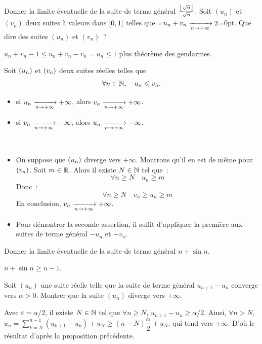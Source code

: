 \documentclass{magnoliaold}
\begin{document}
\begin{exos}
\exo Donner la limite éventuelle de la suite de terme général
  $\frac{\left\lfloor\sqrt{n}\right\rfloor}{\sqrt{n}}$.
\exo Soit $(u_n)$ et $(v_n)$ deux suites à valeurs dans $\left[0,1\right]$
  telles que =\hbox{$u_n+v_n\xrightarrow[n\rightarrow +\infty]{} 2$}=0pt.
  Que dire des suites $(u_n)$ et $(v_n)$~?
  \begin{sol}
  $u_n+v_n-1\leq u_n+v_n-v_n=u_n\leq 1$ plus théorème des gendarmes.
  \end{sol}
\end{exos}

\begin{proposition}[utile=-3]
Soit $\left(u_n\right)$ et $\left(v_n\right)$ deux suites réelles telles que
\[\forall n\in\mathbb{N} ,\quad u_n \leqslant v_n.\]
\begin{itemize}
\item si $u_n\xrightarrow[n\rightarrow +\infty]{}+\infty$, alors
  $v_n\xrightarrow[n\rightarrow +\infty]{}+\infty$.
\item si $v_n\xrightarrow[n\rightarrow +\infty]{}-\infty$, alors
  $u_n\xrightarrow[n\rightarrow +\infty]{}-\infty$.
\end{itemize}
\end{proposition}

\begin{preuve}
$\quad$
\begin{itemize}
\item On suppose que $\left(u_n\right)$ diverge vers $+\infty$. Montrons qu'il en est
  de même pour $\left(v_n\right)$. Soit $m\in\mathbb{R}$. Alors il existe $N\in\mathbb{N}$ tel que~:
  \[\forall n\geq N \quad u_n \geq m\]
  Donc~:
  \[\forall n\geq N \quad v_n \geq u_n \geq m\]
  En conclusion, $v_n\xrightarrow[n\rightarrow +\infty]{}+\infty$.
\item Pour démontrer la seconde assertion, il suffit d'appliquer la première
  aux suites de terme général $-u_n$ et $-v_n$.
\end{itemize}
\end{preuve}

\begin{exos}
\exo Donner la limite éventuelle de la suite de terme général
  $n+\sin n$.
  \begin{sol}
  $n+\sin n\geq n-1$.
  \end{sol}
\exo Soit $(u_n)$ une suite réelle telle que la suite de terme général
  $u_{n+1}-u_n$ converge vers $\alpha>0$. Montrer que la suite $(u_n)$ diverge
  vers $+\infty$.
  \begin{sol}
  Avec $\varepsilon=\alpha/2$, il existe $N\in \mathbb{N}$ tel que $\forall n\geq N$, $u_{n+1}-u_n\geq \alpha/2$. Ainsi, $\forall n> N$, $u_n=\displaystyle \sum_{k=N}^{n-1}(u_{k+1}-u_k)+u_N\geq (n-N)\dfrac{\alpha}{2}+u_N.$ qui tend vers $+\infty$. D'où le résultat d'après la proposition précédente.
  \end{sol}
\end{exos}
\end{document}
